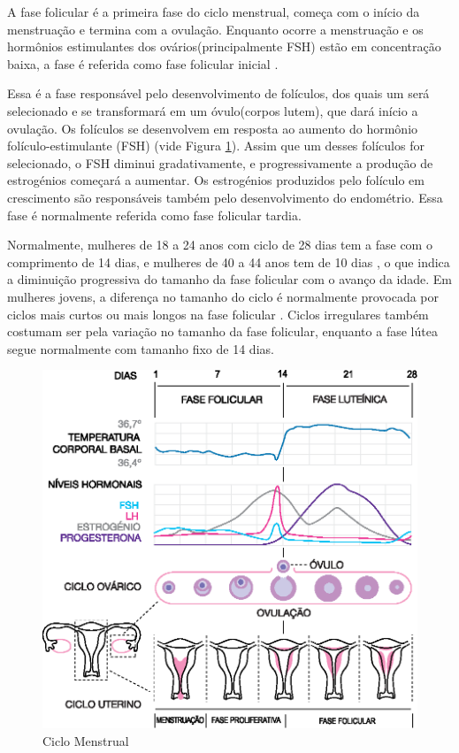 A fase folicular é a primeira fase do ciclo menstrual, começa com o início
da menstruação e termina com a ovulação. Enquanto ocorre a menstruação e os
hormônios estimulantes dos ovários(principalmente FSH) estão em concentração
baixa, a fase é referida como fase folicular inicial \cite{lenton1984a}.

Essa é a fase responsável pelo desenvolvimento de folículos, dos quais um
será selecionado e se transformará em um óvulo(corpos lutem), que dará início
a ovulação. Os folículos se desenvolvem em resposta ao aumento do hormônio
folículo-estimulante (FSH) (vide Figura \ref{fig01}). Assim que um desses folículos for selecionado, o FSH diminui gradativamente, e progressivamente a produção de
estrogénios começará a aumentar. Os estrogénios produzidos pelo folículo em
crescimento são responsáveis também pelo desenvolvimento do endométrio. Essa fase é normalmente referida como fase folicular tardia.


Normalmente, mulheres de 18 a 24 anos com ciclo de 28 dias tem a fase com
o comprimento de 14 dias, e mulheres de 40 a 44 anos tem de 10 dias
\cite{lenton1984a}, o que indica a diminuição progressiva do tamanho da
fase folicular com o avanço da idade. Em mulheres jovens, a diferença no
tamanho do ciclo é normalmente provocada por ciclos mais curtos ou mais
longos na fase folicular \cite{lenton1984a}. Ciclos irregulares também
costumam ser pela variação no tamanho da fase folicular, enquanto a fase
lútea segue normalmente com tamanho fixo de 14 dias.


\begin{figure}[h]
	\centering
	\includegraphics[keepaspectratio=true,scale=0.8]{figuras/MenstrualCycle2_pt.eps}
	\caption{Ciclo Menstrual}
        \label{fig01}
\end{figure}


